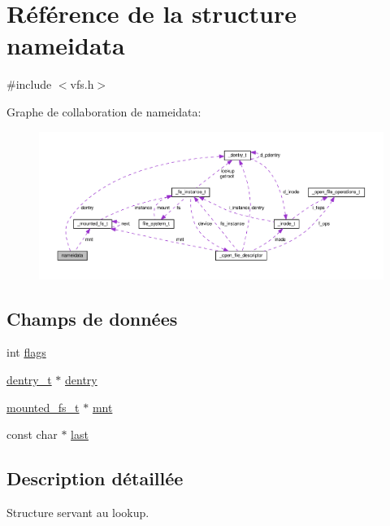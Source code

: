 \hypertarget{structnameidata}{\section{Référence de la structure nameidata}
\label{structnameidata}
}


{\ttfamily \#include $<$vfs.\+h$>$}



Graphe de collaboration de nameidata\+:
\nopagebreak
\begin{figure}[H]
\begin{center}
\leavevmode
\includegraphics[width=350pt]{structnameidata__coll__graph}
\end{center}
\end{figure}
\subsection*{Champs de données}
\begin{DoxyCompactItemize}
\item 
int \hyperlink{structnameidata_a9064ec2b4dd712691e3c7442e48ce798}{flags}
\item 
\hyperlink{vfs_8h_ade5c998c6b3f09d2cf45d0e5ef8787da}{dentry\+\_\+t} $\ast$ \hyperlink{structnameidata_a19b1de01d7a6f689707fa7079cb54d7c}{dentry}
\item 
\hyperlink{vfs_8h_ab4e925860df7937f38b15433bb05225a}{mounted\+\_\+fs\+\_\+t} $\ast$ \hyperlink{structnameidata_a5488ed23ef4b37b431921f71b15e1f19}{mnt}
\item 
const char $\ast$ \hyperlink{structnameidata_a4a11e098a53839c36c2a0a4e732f8037}{last}
\end{DoxyCompactItemize}


\subsection{Description détaillée}
Structure servant au lookup. 

